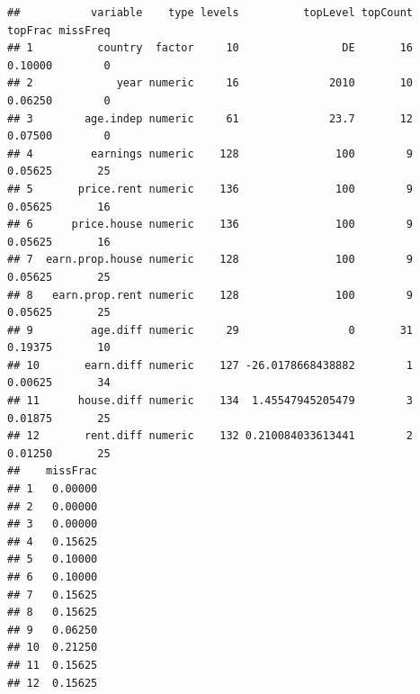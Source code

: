 \documentclass[water,article,submit,pdftex,moreauthors]{Definitions/mdpi}
\newenvironment{Shaded}{\begin{snugshade}}{\end{snugshade}}
\newcommand{\AttributeTok}[1]{\textcolor[rgb]{0.13,0.29,0.53}{#1}}
\newcommand{\ControlFlowTok}[1]{\textcolor[rgb]{0.13,0.29,0.53}{\textbf{#1}}}
\newcommand{\FunctionTok}[1]{\textcolor[rgb]{0.13,0.29,0.53}{\textbf{#1}}}
\newcommand{\NormalTok}[1]{#1}
\newcommand{\OtherTok}[1]{\textcolor[rgb]{0.56,0.35,0.01}{#1}}
\newcommand{\SpecialCharTok}[1]{\textcolor[rgb]{0.81,0.36,0.00}{\textbf{#1}}}
\begin{document}
\begin{verbatim}
##           variable    type levels          topLevel topCount topFrac missFreq
## 1          country  factor     10                DE       16 0.10000        0
## 2             year numeric     16              2010       10 0.06250        0
## 3        age.indep numeric     61              23.7       12 0.07500        0
## 4         earnings numeric    128               100        9 0.05625       25
## 5       price.rent numeric    136               100        9 0.05625       16
## 6      price.house numeric    136               100        9 0.05625       16
## 7  earn.prop.house numeric    128               100        9 0.05625       25
## 8   earn.prop.rent numeric    128               100        9 0.05625       25
## 9         age.diff numeric     29                 0       31 0.19375       10
## 10       earn.diff numeric    127 -26.0178668438882        1 0.00625       34
## 11      house.diff numeric    134  1.45547945205479        3 0.01875       25
## 12       rent.diff numeric    132 0.210084033613441        2 0.01250       25
##    missFrac
## 1   0.00000
## 2   0.00000
## 3   0.00000
## 4   0.15625
## 5   0.10000
## 6   0.10000
## 7   0.15625
## 8   0.15625
## 9   0.06250
## 10  0.21250
## 11  0.15625
## 12  0.15625
\end{verbatim}

\begin{Shaded}
\end{Shaded}
\end{document}
